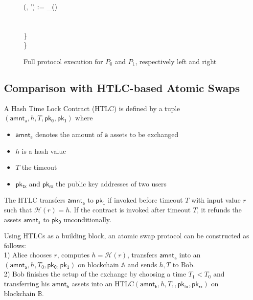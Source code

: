 \begin{figure}[H]
\begin{minipage}[t]{0.5\textwidth}
\begin{pchstack}[boxed]
{        \qquad (, ') := _() \\
        \qquad {} \:\:   \\ %
        \qquad \quad {} \perp \\
        \quad \} \\
        \} \\
    }
    \end{pchstack}
    \end{minipage}%
    \caption{Full protocol execution for $P_0$ and $P_1$, respectively left and right}
    \end{figure}

\subsection{Comparison with HTLC-based Atomic Swaps}

\begin{definition}
    A Hash Time Lock Contract (HTLC) is defined by a tuple $(\mathsf{amnt_a}, h, T, \mathsf{pk_0}, \mathsf{pk_1})$ where 
    \begin{itemize}
        \item $\mathsf{amnt_a}$ denotes the amount of $\mathsf{a}$ assets to be exchanged
        \item $h$ is a hash value
        \item $T$ the timeout
        \item $\mathsf{pk_{tx}}$ and $\mathsf{pk_{rx}}$ the public key addresses of two users
    \end{itemize}
\end{definition}

The HTLC transfers $\mathsf{amnt_a}$ to $\mathsf{pk_1}$ if invoked before timeout $T$ with input value $r$ such that $\mathcal{H}(r) = h$. 
If the contract is invoked after timeout $T$, it refunds the assets $\mathsf{amnt_a}$ to $\mathsf{pk_0}$ unconditionally.

Using HTLCs as a building block, an atomic swap protocol can be constructed as follows: \\
1) Alice chooses $r$, computes $h = \mathcal{H}(r)$, transfers $\mathsf{amnt_a}$ into an $(\mathsf{amnt_a}, h, T_0, \mathsf{pk_0}, \mathsf{pk_1})$ on blockchain $\mathbb{A}$ and sends $h,T$ to Bob. \\
2) Bob finishes the setup of the exchange by choosing a time $T_1 < T_0$ and transferring his $\mathsf{amnt_b}$ assets into an HTLC$(\mathsf{amnt_b}, h, T_1, \mathsf{pk_{tx}}, \mathsf{pk_{rx}})$ on blockchain $\mathbb{B}$.


